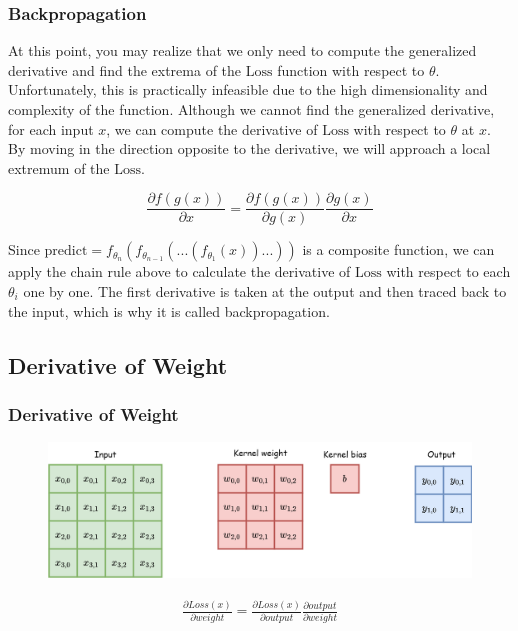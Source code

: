 \documentclass{beamer}
\begin{document}
    \begin{frame}
    	\frametitle{Backpropagation}   	
    	\justifying
    	At this point, you may realize that we only need to compute the generalized derivative and find the extrema of the \( \text{Loss} \) function with respect to \( \theta \). Unfortunately, this is practically infeasible due to the high dimensionality and complexity of the function. Although we cannot find the generalized derivative, for each input \( x \), we can compute the derivative of \( \text{Loss} \) with respect to \( \theta \) at \( x \). By moving in the direction opposite to the derivative, we will approach a local extremum of the \( \text{Loss} \).
    	
    	\[
    	\frac{\partial f(g(x))}{\partial x} = \frac{\partial f(g(x))}{\partial g(x)} \frac{\partial g(x)}{\partial x}
    	\]
    	
    	Since \( \text{predict} = f_{\theta_n}(f_{\theta_{n-1}}(...(f_{\theta_1}(x))...)) \) is a composite function, we can apply the chain rule above to calculate the derivative of \( \text{Loss} \) with respect to each \( \theta_i \) one by one. The first derivative is taken at the output and then traced back to the input, which is why it is called backpropagation.
    \end{frame}
    
    \subsection{Derivative of Weight}
    
    \begin{frame}
    	\frametitle{Derivative of Weight}
    	\justifying
   
    	\begin{figure}
    		\centering
    		\includegraphics[width=0.8\linewidth]{src/conv.drawio (2).png}
    	\end{figure}
    	
    	\begin{align*}
    		\frac{\partial Loss(x)}{\partial weight} = \frac{\partial Loss(x)}{\partial output} \frac{\partial output}{\partial weight}
    	\end{align*}
    \end{frame}
    
\end{document}
